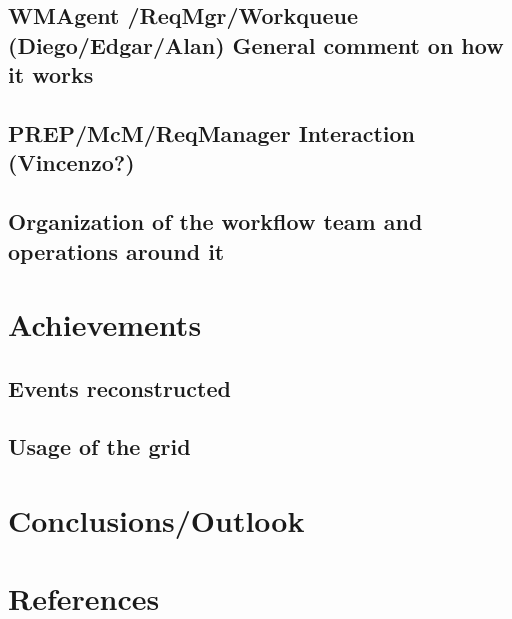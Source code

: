 \documentclass[journal, transmag]{IEEEtran}
\begin{document}
\subsection{WMAgent /ReqMgr/Workqueue (Diego/Edgar/Alan) General comment on how it works}
\subsection{PREP/McM/ReqManager Interaction (Vincenzo?)}
\subsection{Organization of the workflow team and operations around it }


\section{Achievements}
\subsection{Events reconstructed}
\subsection{Usage of the grid}
\section{Conclusions/Outlook}
\section*{References}

\end{document}
